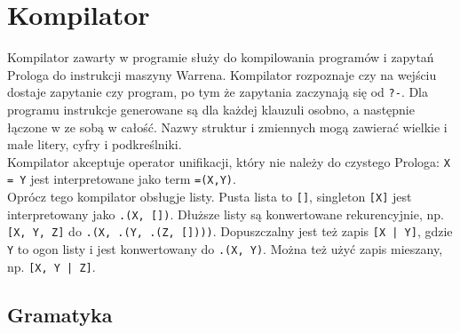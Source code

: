 \chapter{Kompilator}
\thispagestyle{chapterBeginStyle}

\iffalse
W tym rozdziale należy omówić zawartość pakietu instalacyjnego oraz założenia co do środowiska, w którym realizowany system będzie instalowany. Należy przedstawić procedurę instalacji i wdrożenia systemu. Czynności instalacyjne powinny być szczegółowo rozpisane na kroki. Procedura wdrożenia powinna obejmować konfigurację platformy sprzętowej, OS (np. konfiguracje niezbędnych sterowników) oraz konfigurację wdrażanego systemu, m.in.\ tworzenia niezbędnych kont użytkowników. Procedura instalacji powinna prowadzić od stanu, w którym nie są zainstalowane żadne składniki systemu, do stanu w którym system jest gotowy do pracy i oczekuje na akcje typowego użytkownika.
\fi

Kompilator zawarty w programie służy do kompilowania programów i zapytań Prologa do instrukcji maszyny Warrena. Kompilator rozpoznaje czy na wejściu dostaje zapytanie czy program, po tym że zapytania zaczynają się od \texttt{?-}. Dla programu instrukcje generowane są dla każdej klauzuli osobno, a następnie łączone w ze sobą w całość. Nazwy struktur i zmiennych mogą zawierać wielkie i małe litery, cyfry i podkreślniki.\\
Kompilator akceptuje operator unifikacji, który nie należy do czystego Prologa: \texttt{X = Y} jest interpretowane jako term \texttt{=(X,Y)}.\\
Oprócz tego kompilator obsługje listy. Pusta lista to \texttt{[]}, singleton \texttt{[X]} jest interpretowany jako \texttt{.(X, [])}. Dłuższe listy są konwertowane rekurencyjnie, np. \texttt{[X, Y, Z]} do \texttt{.(X, .(Y, .(Z, [])))}. Dopuszczalny jest też zapis \texttt{[X | Y]}, gdzie \texttt{Y} to ogon listy i jest konwertowany do \texttt{.(X, Y)}. Można też użyć zapis mieszany, np. \texttt{[X, Y | Z]}.

\section{Gramatyka}

